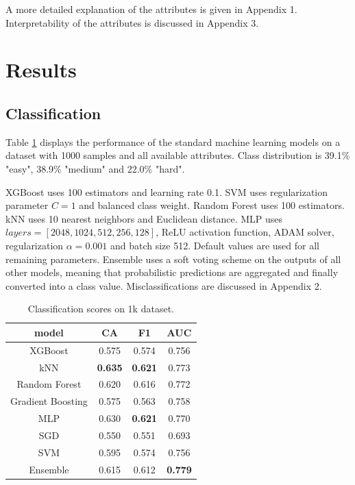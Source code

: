 \documentclass[sigconf,nonacm]{acmart}
\begin{document}
A more detailed explanation of the attributes is given in Appendix 1. Interpretability of the attributes is discussed in Appendix 3.

\section{Results}

\subsection{Classification}

Table \ref{classification} displays the performance of the standard machine learning models \cite{scikit} on a dataset with 1000 samples and all available attributes. Class distribution is 39.1\% "easy", 38.9\% "medium" and 22.0\% "hard". 

XGBoost uses 100 estimators and learning rate 0.1. SVM uses regularization parameter $C=1$ and balanced class weight. Random Forest uses 100 estimators. kNN uses 10 nearest neighbors and Euclidean distance. MLP uses $layers=[2048, 1024, 512, 256, 128]$, ReLU activation function, ADAM solver, regularization $\alpha=0.001$ and batch size 512. Default values are used for all remaining parameters. Ensemble uses a soft voting scheme on the outputs of all other models, meaning that probabilistic predictions are aggregated and finally converted into a class value. Misclassifications are discussed in Appendix 2. 

\begin{center}
\begin{table}[!ht]
\caption{Classification scores on 1k dataset.
\label{classification}}
\centering
{\begin{tabular}{c|c|c|c}
model & CA & F1 & AUC \\ \hline
XGBoost & 0.575 & 0.574 & 0.756 \\
kNN & \textbf{0.635} & \textbf{0.621} & 0.773 \\
Random Forest & 0.620 & 0.616 & 0.772  \\
Gradient Boosting & 0.575 & 0.563 & 0.758  \\
MLP & 0.630 & \textbf{0.621} & 0.770 \\
SGD & 0.550 & 0.551 & 0.693 \\
SVM & 0.595 & 0.574 & 0.756 \\
Ensemble & 0.615 & 0.612 & \textbf{0.779} \\
\end{tabular}}
\end{table}
\end{center}
\end{document}
